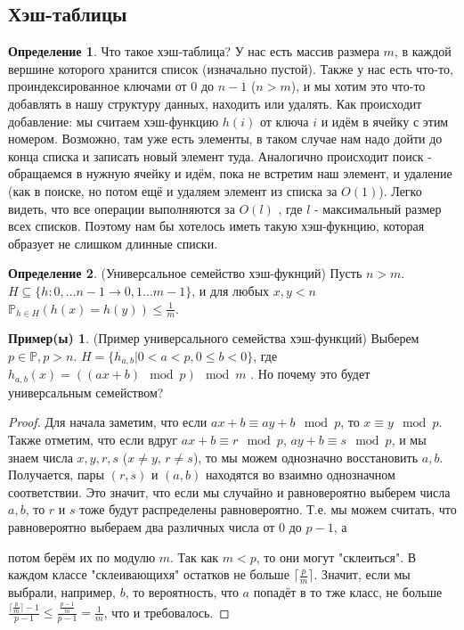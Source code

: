 \documentclass[a4paper]{article}
\theoremstyle{indented}
\theoremstyle{definition}
\newtheorem{defn}{Определение}
\newtheorem{exl}{Пример(ы)}
\theoremstyle{remark}
\DeclareMathOperator{\ra}{\rightarrow}
\begin{document}
\subsection{Хэш-таблицы} 
\begin{defn}
Что такое хэш-таблица? У нас есть массив размера $m$, в каждой вершине которого хранится список (изначально пустой). Также у нас есть что-то, проиндексированное ключами от $0$ до $n-1$ ($n>m$), и мы хотим это что-то добавлять в нашу структуру данных, находить или удалять. Как происходит добавление: мы считаем хэш-функцию $h(i)$ от ключа $i$ и идём в ячейку с этим номером. Возможно, там уже есть элементы, в таком случае нам надо дойти до конца списка и записать новый элемент туда. Аналогично происходит поиск - обращаемся в нужную ячейку и идём, пока не встретим наш элемент, и удаление (как в поиске, но потом ещё и удаляем элемент из списка за $O(1)$). Легко видеть, что все операции выполняются за $O(l)$ , где $l$ - максимальный размер всех списков. Поэтому нам бы хотелось иметь такую хэш-фукнцию, которая образует не слишком длинные списки.
\end{defn}
\begin{defn}
(Универсальное семейство хэш-фукнций)
Пусть $n>m$. $H \subseteq \{h: 0, ... n-1 \ra 0, 1 ... m-1\}$, и для любых $x, y < n$ $\mathbb{P}_{h \in H}(h(x)=h(y)) \leq \frac{1}{m}$.
\end{defn}
\begin{exl}
(Пример универсального семейства хэш-функций) Выберем $p \in \mathbb{P}, p>n$. $H=\{h_{a, b} | 0<a<p, 0 \leq b < 0\}$, где $h_{a, b}(x)=((ax+b) \mod p) \mod m$ . Но почему это будет универсальным семейством?
\end{exl}
\begin{proof}
Для начала заметим, что если $ax+b \equiv ay+b \mod p$, то $x \equiv y \mod p$. Также отметим, что если вдруг $ax+b \equiv r \mod p$, $ay+b \equiv s \mod p$, и мы знаем числа $x, y, r, s$ ($x \neq y$, $r \neq s$), то мы можем однозначно восстановить $a, b$. Получается, пары $(r, s)$ и $(a, b)$ находятся во взаимно однозначном соответствии. Это значит, что если мы случайно и равновероятно выберем числа $a, b$, то $r$ и $s$ тоже будут распределены равновероятно. Т.е. мы можем считать, что равновероятно выбераем два различных числа от $0$ до $p-1$, а
 
потом берём их по модулю $m$. Так как $m<p$, то они могут "склеиться". В каждом классе "склеивающихя" остатков не больше $\lceil \frac{p}{m} \rceil $. Значит, если мы выбрали, например, $b$, то вероятность, что $a$ попадёт в то тже класс, не больше $\frac{\lceil \frac{p}{m} \rceil -1}{p-1} \leq \frac{\frac{p-1}{m}}{p-1}=\frac{1}{m}$, что и требовалось.
\end{proof}
\end{document}
